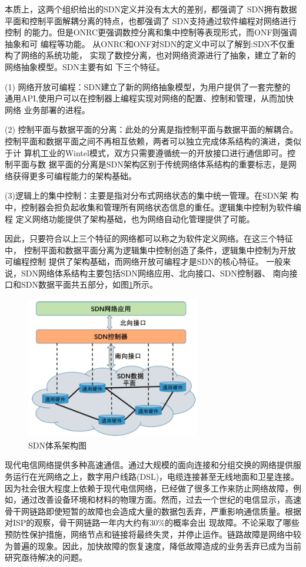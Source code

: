 本质上，这两个组织给出的SDN定义并没有太大的差别，都强调了 SDN拥有数据 平面和控制平面解耦分离的特点，也都强调了 SDN支持通过软件编程对网络进行控制 的能力。但是ONRC更强调数控分离和集中控制等表现形式，而ONF则强调抽象和可 编程等功能。
从ONRC和ONF对SDN的定义中可以了解到:SDN不仅重构了网络的系统功能， 实现了数控分离，也对网络资源进行了抽象，建立了新的网络抽象模型。SDN主要有如 下三个特征。

(1)	网络开放可编程：SDN建立了新的网络抽象模型，为用户提供了一套完整的 通用API,使用户可以在控制器上编程实现对网络的配置、控制和管理，从而加快网络 业务部署的进程。

(2)	控制平面与数据平面的分离：此处的分离是指控制平面与数据平面的解耦合。 控制平面和数据平面之间不再相互依赖，两者可以独立完成体系结构的演进，类似于计 算机工业的Wintel模式，双方只需要遵循统一的开放接口进行通信即可。控制平面与数 据平面的分离是SDN架构区别于传统网络体系结构的重要标志，是网络获得更多可编程能力的架构基础。

(3)逻辑上的集中控制：主要是指对分布式网络状态的集中统一管理。在SDN架 构中，控制器会担负起收集和管理所有网络状态信息的重任。逻辑集中控制为软件编程 定义网络功能提供了架构基础，也为网络自动化管理提供了可能。

因此，只要符合以上三个特征的网络都可以称之为软件定义网络。在这三个特征中， 控制平面和数据平面分离为逻辑集中控制创造了条件，逻辑集中控制为开放可编程控制 提供了架构基础，而网络开放可编程才是SDN的核心特征。
一般来说，SDN网络体系结构主要包括SDN网络应用、北向接口、SDN控制器、 南向接口和SDN数据平面共五部分，如图\ref{fig:SDNArchitectureDiagram}所示。

\begin{figure}[htbp]
\centering
\includegraphics[width=3.0in]{figures/SDNArchitectureDiagram}
  \caption{SDN体系架构图}
  \label{fig:SDNArchitectureDiagram}
\end{figure}

现代电信网络提供多种高速通信。通过大规模的面向连接和分组交换的网络提供服务运行在光网络之上，数字用户线路(DSL)，电缆连接甚至无线地面和卫星连接。因为社会很大程度上依赖于现代电信网络，已经做了很多工作来防止网络故障，例如，通过改善设备环境和材料的物理方面。然而，过去一个世纪的电信显示，高速骨干网链路即使短暂的故障也会造成大量的数据包丢弃，严重影响通信质量。根据对ISP的观察，骨干网链路一年内大约有30\%的概率会出
现故障\cite{doerr2014all}。不论采取了哪些预防性保护措施，网络节点和链接将最终失灵，并停止运作。链路故障是网络中较为普遍的现象。因此，加快故障的恢复速度，降低故障造成的业务丢弃已成为当前研究亟待解决的问题。

